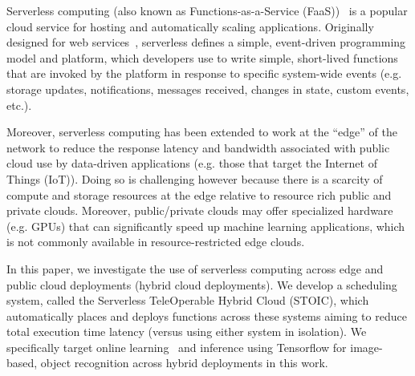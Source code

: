 Serverless computing (also known as Functions-as-a-Ser\-vice (FaaS))~\cite{ref:aws-lambda,ref:faas3,ref:afunctions-16} is a popular cloud service for hosting and automatically scaling applications. Originally designed for web services~\cite{ref:lambda-webservices,ref:lambda-microservices}, serverless defines a simple, event-driven programming model and platform, which developers use to write simple, short-lived functions that are invoked by the platform in response to specific system-wide events (e.g. storage updates, notifications, messages received, changes in state, custom events, etc.). 


Moreover, serverless computing has been extended to work at the ``edge'' of the network to reduce the response latency and bandwidth associated with public cloud use by data-driven applications (e.g.  those that target the Internet of Things (IoT)). Doing so is challenging however because there is a scarcity of compute and storage resources at the edge relative to resource rich public and private clouds. Moreover, public/private clouds may offer specialized hardware (e.g. GPUs) that can significantly speed up machine learning applications, which is not commonly available in resource-restricted edge clouds.

In this paper, we investigate the use of serverless computing across edge and public cloud deployments (hybrid cloud deployments). We develop a scheduling system, called the Serverless TeleOperable Hybrid Cloud (STOIC), which automatically places and deploys functions across these systems aiming to reduce total execution time latency (versus using either system in isolation). We specifically target online learning~\cite{ref:onlinelearning} and inference using Tensorflow for image-based, object recognition across hybrid deployments in this work.

